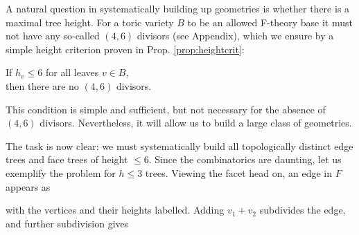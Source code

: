 \documentclass[aps,prl,twocolumn, superscriptaddress,groupedaddress,nofootinbib]{revtex4-1}
\begin{document}
A natural question
in systematically building up geometries is whether there is
a maximal tree height. For a toric variety $B$ to be an allowed
F-theory base it must not have any so-called $(4,6)$ divisors (see Appendix), which
we ensure by a simple height criterion proven in Prop. \ref{prop:heightcrit}:
\begin{center}
If $h_v\leq 6$ for all leaves $v\in B$, \\ then there are no $(4,6)$
divisors.
\end{center}
This condition is simple and sufficient, but not necessary
for the absence of $(4,6)$ divisors. Nevertheless, it
will allow us to build a large class of geometries.


\vspace{.5cm}
The task is now clear: we must systematically build  all
topologically distinct edge trees and face trees of height 
$\leq 6$. Since the combinatorics are daunting, let us
exemplify the problem for $h\leq 3$ trees. Viewing the
facet head on, an edge in $F$ appears as 
\begin{center}
\end{center}
with the vertices and their heights labelled.
Adding $v_1+v_2$ subdivides the
edge, and further subdivision gives
\end{document}
